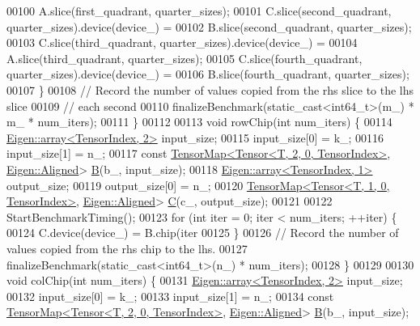 \begin{DoxyCode}
00100           A.slice(first\_quadrant, quarter\_sizes);
00101       C.slice(second\_quadrant, quarter\_sizes).device(device\_) =
00102           B.slice(second\_quadrant, quarter\_sizes);
00103       C.slice(third\_quadrant, quarter\_sizes).device(device\_) =
00104           A.slice(third\_quadrant, quarter\_sizes);
00105       C.slice(fourth\_quadrant, quarter\_sizes).device(device\_) =
00106           B.slice(fourth\_quadrant, quarter\_sizes);
00107     \}
00108     \textcolor{comment}{// Record the number of values copied from the rhs slice to the lhs slice}
00109     \textcolor{comment}{// each second}
00110     finalizeBenchmark(static\_cast<int64\_t>(m\_) * m\_ * num\_iters);
00111   \}
00112 
00113   \textcolor{keywordtype}{void} rowChip(\textcolor{keywordtype}{int} num\_iters) \{
00114     \hyperlink{class_eigen_1_1array}{Eigen::array<TensorIndex, 2>} input\_size;
00115     input\_size[0] = k\_;
00116     input\_size[1] = n\_;
00117     \textcolor{keyword}{const} \hyperlink{class_eigen_1_1_tensor_map}{TensorMap<Tensor<T, 2, 0, TensorIndex>}, 
      \hyperlink{group__enums_gga45fe06e29902b7a2773de05ba27b47a1ad37d4c71425bb286e9b4103830538fbf}{Eigen::Aligned}> \hyperlink{group___core___module_class_eigen_1_1_matrix}{B}(b\_, input\_size);
00118     \hyperlink{class_eigen_1_1array}{Eigen::array<TensorIndex, 1>} output\_size;
00119     output\_size[0] = n\_;
00120     \hyperlink{class_eigen_1_1_tensor_map}{TensorMap<Tensor<T, 1, 0, TensorIndex>}, 
      \hyperlink{group__enums_gga45fe06e29902b7a2773de05ba27b47a1ad37d4c71425bb286e9b4103830538fbf}{Eigen::Aligned}> \hyperlink{group___core___module}{C}(c\_, output\_size);
00121 
00122     StartBenchmarkTiming();
00123     \textcolor{keywordflow}{for} (\textcolor{keywordtype}{int} iter = 0; iter < num\_iters; ++iter) \{
00124       C.device(device\_) = B.chip(iter %
00125     \}
00126     \textcolor{comment}{// Record the number of values copied from the rhs chip to the lhs.}
00127     finalizeBenchmark(static\_cast<int64\_t>(n\_) * num\_iters);
00128   \}
00129 
00130   \textcolor{keywordtype}{void} colChip(\textcolor{keywordtype}{int} num\_iters) \{
00131     \hyperlink{class_eigen_1_1array}{Eigen::array<TensorIndex, 2>} input\_size;
00132     input\_size[0] = k\_;
00133     input\_size[1] = n\_;
00134     \textcolor{keyword}{const} \hyperlink{class_eigen_1_1_tensor_map}{TensorMap<Tensor<T, 2, 0, TensorIndex>}, 
      \hyperlink{group__enums_gga45fe06e29902b7a2773de05ba27b47a1ad37d4c71425bb286e9b4103830538fbf}{Eigen::Aligned}> \hyperlink{group___core___module_class_eigen_1_1_matrix}{B}(b\_, input\_size);

\end{DoxyCode}
